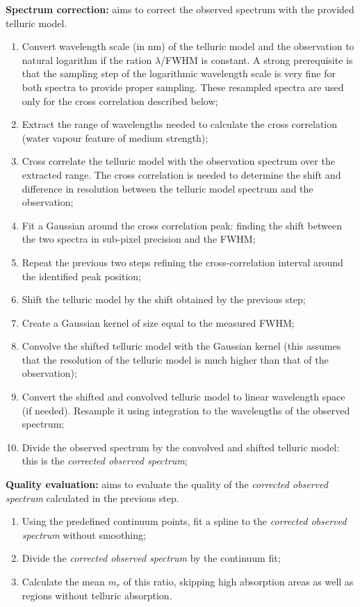 \textbf{Spectrum correction: }aims to correct the observed spectrum with the provided telluric model.
\begin{enumerate}
\item Convert wavelength scale (in nm) of the telluric model and the
  observation to natural logarithm if the ration $\lambda$/FWHM is
  constant. A strong prerequisite is that the sampling step of the
  logarithmic wavelength scale is very fine for both spectra to
  provide proper sampling. These resampled spectra are used only for
  the cross correlation described below;
\item Extract the range of wavelengths needed to calculate the cross correlation (water vapour feature of medium strength);
\item Cross correlate the telluric model with the observation spectrum
  over the extracted range. The cross correlation is needed to
  determine the shift and difference in resolution between the
  telluric model spectrum and the observation;
\item Fit a Gaussian around the cross correlation peak: finding the shift between the two spectra in sub-pixel precision and the FWHM;
\item Repeat the previous two steps refining the cross-correlation interval around the identified peak position;
\item Shift the telluric model by the shift obtained by the previous step;
\item Create a Gaussian kernel of size equal to the measured FWHM;
\item Convolve the shifted telluric model with the Gaussian kernel
  (this assumes that the resolution of the telluric model is much
  higher than that of the observation);
\item Convert the shifted and convolved telluric model to linear wavelength space (if needed). Resample it using integration to the wavelengths of the observed spectrum;
\item Divide the observed spectrum by the convolved and shifted telluric model: this is the \textit{corrected observed spectrum};
\end{enumerate}

\textbf{Quality evaluation: } aims to evaluate the quality of the \textit{corrected observed spectrum} calculated in the previous step.
\begin{enumerate}
\item Using the predefined continuum points, fit a spline to the \textit{corrected observed spectrum} without smoothing;
\item Divide the \textit{corrected observed spectrum} by the continuum fit;
\item Calculate the mean $m_r$ of this ratio, skipping high absorption
  areas as well as regions without telluric absorption. 
\end{enumerate}

